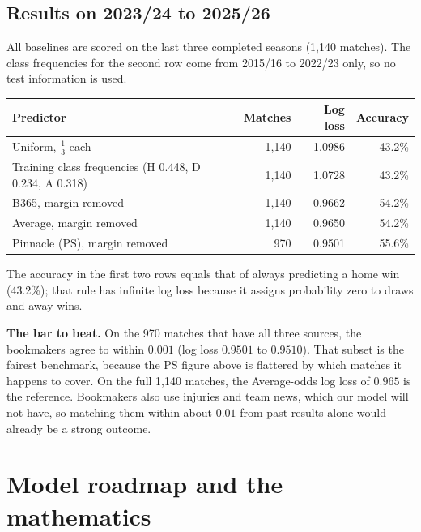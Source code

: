 \documentclass[12pt,a4paper]{article}
\newcommand{\tabfont}{\small\setstretch{1.05}}
\begin{document}
\subsection{Results on 2023/24 to 2025/26}

All baselines are scored on the last three completed seasons (1{,}140 matches). The class
frequencies for the second row come from 2015/16 to 2022/23 only, so no test information is used.

\begin{center}
\tabfont
\renewcommand{\arraystretch}{1.25}
\begin{tabular}{lrrr}
\toprule
\textbf{Predictor} & \textbf{Matches} & \textbf{Log loss} & \textbf{Accuracy}\\
\midrule
Uniform, $\tfrac13$ each & 1{,}140 & 1.0986 & 43.2\%\\
Training class frequencies (H 0.448, D 0.234, A 0.318) & 1{,}140 & 1.0728 & 43.2\%\\
B365, margin removed & 1{,}140 & 0.9662 & 54.2\%\\
Average, margin removed & 1{,}140 & 0.9650 & 54.2\%\\
Pinnacle (PS), margin removed & 970 & 0.9501 & 55.6\%\\
\bottomrule
\end{tabular}
\end{center}

The accuracy in the first two rows equals that of always predicting a home win (43.2\%); that rule
has infinite log loss because it assigns probability zero to draws and away wins.

\begin{keybox}
\textbf{The bar to beat.} On the 970 matches that have all three sources, the bookmakers agree to
within $0.001$ (log loss $0.9501$ to $0.9510$). That subset is the fairest benchmark, because the PS
figure above is flattered by which matches it happens to cover. On the full 1{,}140 matches, the
Average-odds log loss of $0.965$ is the reference. Bookmakers also use injuries and team news, which
our model will not have, so matching them within about $0.01$ from past results alone would
already be a strong outcome.
\end{keybox}

\section{Model roadmap and the mathematics}
\end{document}
